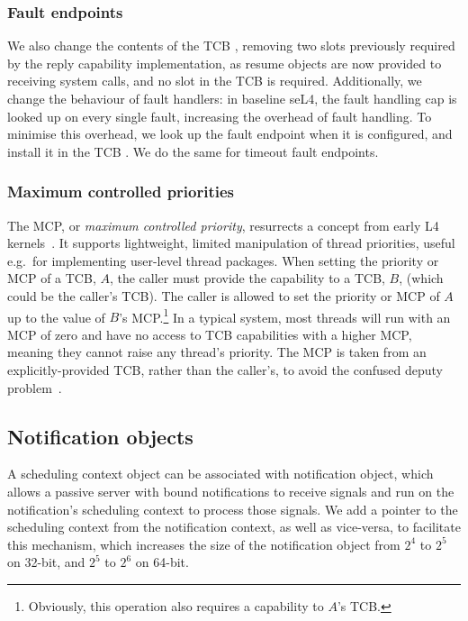\subsubsection{Fault endpoints}

We also change the contents of the TCB \cnode, removing two slots previously required by the reply
capability implementation, as resume objects are now provided to receiving system calls, and
no slot in the TCB \cnode is required. Additionally, we change the behaviour of fault handlers: in
baseline seL4, the fault handling cap is looked up on every single fault, increasing the overhead of
fault handling. To minimise this overhead, we look up the fault endpoint when it is configured, and
install it in the TCB \cnode. We do the same for timeout fault endpoints. 

\subsubsection{Maximum controlled priorities}

The MCP, or \emph{maximum controlled priority}, resurrects a concept from early L4
kernels~\citep{Liedtke_96:rm}. It supports lightweight, limited manipulation of thread priorities,
useful e.g.\ for implementing user-level thread packages. When setting
the priority or MCP of a TCB, \(A\),
the caller must provide the capability to a TCB, \(B\), (which could be the caller's
TCB). The caller is allowed to set the priority or MCP of \(A\) up to the value
of \(B\)'s MCP.\footnote{Obviously, this operation also requires a capability to \(A\)'s TCB.}
In a typical system, most threads
will run with an MCP of zero and have no access to TCB capabilities with a higher MCP, meaning they
cannot raise any thread's priority.
The MCP is taken from an explicitly-provided TCB, rather than the caller's, to avoid the
confused deputy problem~\citep{Hardy_88}.

\subsection{Notification objects}

A scheduling context object can be associated with notification object, which allows a passive
server with bound notifications to receive signals and run on the notification's
scheduling context to process those signals.
We add a pointer to the scheduling context from the notification context, as well as vice-versa, to 
facilitate this mechanism, which increases the size of the notification object from $2^{4}$ to
$2^{5}$ on 32-bit, and $2^{5}$ to $2^{6}$ on 64-bit. 

